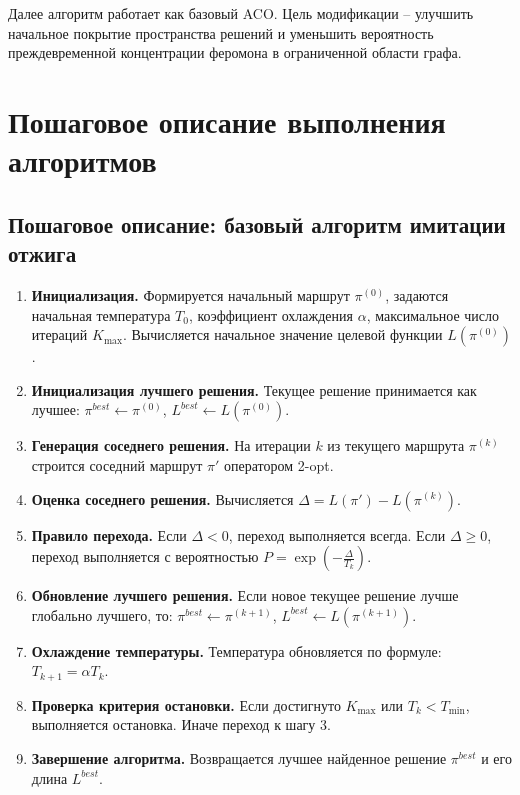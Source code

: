 \documentclass[12pt,a4paper]{article}
\begin{document}
Далее алгоритм работает как базовый ACO.
Цель модификации -- улучшить начальное покрытие пространства решений и уменьшить
вероятность преждевременной концентрации феромона в ограниченной области графа.

\section{Пошаговое описание выполнения алгоритмов}
\label{sec:steps}

\subsection{Пошаговое описание: базовый алгоритм имитации отжига}

\begin{enumerate}
    \item \textbf{Инициализация.}
    Формируется начальный маршрут $\pi^{(0)}$, задаются начальная температура $T_0$,
    коэффициент охлаждения $\alpha$, максимальное число итераций $K_{\max}$.
    Вычисляется начальное значение целевой функции $L(\pi^{(0)})$.
    
    \item \textbf{Инициализация лучшего решения.}
    Текущее решение принимается как лучшее:
    $\pi^{best} \leftarrow \pi^{(0)}$, $L^{best} \leftarrow L(\pi^{(0)})$.

    \item \textbf{Генерация соседнего решения.}
    На итерации $k$ из текущего маршрута $\pi^{(k)}$ строится соседний маршрут
    $\pi'$ оператором 2-opt.

    \item \textbf{Оценка соседнего решения.}
    Вычисляется $\Delta = L(\pi') - L(\pi^{(k)})$.

    \item \textbf{Правило перехода.}
    Если $\Delta < 0$, переход выполняется всегда.
    Если $\Delta \ge 0$, переход выполняется с вероятностью
    $P=\exp\left(-\frac{\Delta}{T_k}\right)$.

    \item \textbf{Обновление лучшего решения.}
    Если новое текущее решение лучше глобально лучшего, то:
    $\pi^{best} \leftarrow \pi^{(k+1)}$, $L^{best} \leftarrow L(\pi^{(k+1)})$.

    \item \textbf{Охлаждение температуры.}
    Температура обновляется по формуле:
    $T_{k+1}=\alpha T_k$.

    \item \textbf{Проверка критерия остановки.}
    Если достигнуто $K_{\max}$ или $T_k < T_{\min}$, выполняется остановка.
    Иначе переход к шагу 3.

    \item \textbf{Завершение алгоритма.}
    Возвращается лучшее найденное решение $\pi^{best}$ и его длина $L^{best}$.
\end{enumerate}
\end{document}
